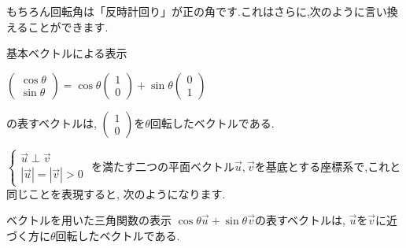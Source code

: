 \documentclass[10pt,fleqn,a4paper]{jsarticle}
\begin{document}
もちろん回転角は「反時計回り」が正の角です.これはさらに,次のように言い換えることができます.\
\begin{itembox}
[l]{\enpitu 基本ベクトルによる表示}
\begin{center}
$
\begin{pmatrix}
\cos\theta\\
\sin\theta
\end{pmatrix}
=
\cos\theta
\begin{pmatrix}
1\\
0
\end{pmatrix}
+
\sin\theta
\begin{pmatrix}
0\\
1
\end{pmatrix}
$
\end{center}
の表すベクトルは,
$\begin{pmatrix}1\\0\end{pmatrix}$を$\theta$回転したベクトルである.
\end{itembox}

$
\begin{cases}
\vec{u}\perp\vec{v}\\
|\vec{u}|=|\vec{v}|>0
\end{cases}
$
を満たす二つの平面ベクトル$\vec{u},\vec{v}$を基底とする座標系で,これと同じことを表現すると,
次のようになります.\
\begin{itembox}
[l]{\enpitu ベクトルを用いた三角関数の表示}
$\cos\theta\vec{u}+\sin\theta\vec{v}$の表すベクトルは,
$\vec{u}$を$\vec{v}$に近づく方に$\theta$回転したベクトルである.
\end{itembox}
\end{document}
